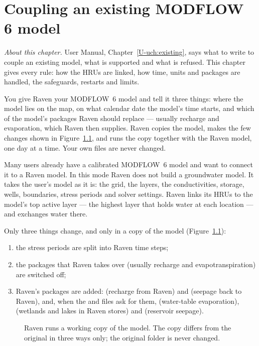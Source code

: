 \chapter{Coupling an existing MODFLOW 6 model}\label{ch:existing}
\noindent\emph{About this chapter.} User Manual, Chapter~\ref{U-uch:existing}, says what to write
to couple an existing model, what is supported and what is refused. This chapter gives every rule: how the HRUs are
linked, how time, units and packages are handled, the safeguards, restarts and limits.


\begin{plain}
You give Raven your MODFLOW~6 model and tell it three things: where the model lies on the map, on what calendar date the
model's time starts, and which of the model's packages Raven should replace --- usually recharge and evaporation, which Raven
then supplies. Raven copies the model, makes the few changes shown in Figure~\ref{fig:workcopy}, and runs the copy together
with the Raven model, one day at a time. Your own files are never changed.
\end{plain}

Many users already have a calibrated MODFLOW~6 model and want to connect it to a Raven model. In this mode Raven does not
build a groundwater model. It takes the user's model as it is: the grid, the layers, the conductivities, storage, wells,
boundaries, stress periods and solver settings. Raven links its HRUs to the model's top active layer --- the highest layer
that holds water at each location --- and exchanges water there.

Only three things change, and only in a copy of the model (Figure~\ref{fig:workcopy}):
\begin{enumerate}
\item the stress periods are split into Raven time steps;
\item the packages that Raven takes over (usually recharge and evapotranspiration) are switched off;
\item Raven's packages are added:  (recharge from Raven) and  (seepage back to Raven), and, when
the  and  files ask for them,  (water-table evaporation),  (wetlands and lakes in
Raven stores) and  (reservoir seepage).
\end{enumerate}

\begin{figure}[!htbp]\centering
\caption{Raven runs a working copy of the model. The copy differs from the original in three ways only; the original folder is never changed.}\label{fig:workcopy}
\end{figure}

